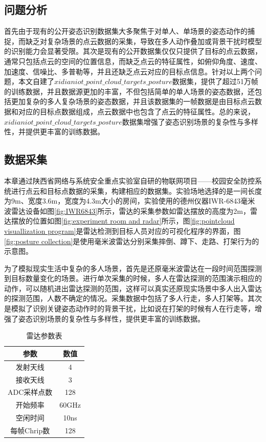 \subsection{问题分析}
首先由于现有的公开姿态识别数据集大多聚焦于对单人、单场景的姿态动作的捕捉，而缺乏对复杂场景的点云数据的采集，导致在多人动作叠加或背景干扰时模型的识别能力会显著受限。其次是现有的公开数据集仅仅只提供了目标的点云数据，通常只包括点云的空间的位置信息，而缺乏点云的特征属性，如俯仰角度、速度、加速度、信噪比、多普勒等，并且还缺乏点云对应的目标点信息。针对以上两个问题，本文自建了$xidianiot\_point\_cloud\_targets\_posture$数据集，提供了超过51万帧的训练数据，并且数据源更加的丰富，不但包括简单的单人场景的姿态数据，还包括更加复杂的多人复杂场景的姿态数据，并且该数据集的一帧数据是由目标点云数据和对应的目标点数据组成，点云数据中也包含了点云的特征属性。总的来说，$xidianiot\_point\_cloud\_targets\_posture$数据集增强了姿态识别场景的复杂性与多样性，并提供更丰富的训练数据。

\subsection{数据采集}
\label{sec:data-collection}
本章通过陕西省网络与系统安全重点实验室自研的物联网项目——校园安全防控系统进行点云和目标点数据的采集，构建相应的数据集。实验场地选择的是一间长度为9m、宽度3.6m，宽度为4.3m大小的房间，实验使用的德州仪器IWR-6843毫米波雷达设备如图\eqref{fig:IWR6843}所示，雷达的采集参数如雷达摆放的高度为2m，雷达摆放的位置如图\eqref{fig:experiment room and radar}所示，图\eqref{fig:pointcloud visuallization program}是雷达检测到目标人员对应的可视化程序的界面，图\eqref{fig:posture collection}是使用毫米波雷达分别采集摔倒、蹲下、走路、打架行为的示意图。

为了模拟现实生活中复杂的多人场景，首先是还原毫米波雷达在一段时间范围探测到目标数量变化的场景。进行单次采集的时候，多人在雷达探测的范围演示相应的动作，可以随机进出雷达探测的范围，这样可以真实还原现实场景中多人出入雷达的探测范围，人数不确定的情况。采集数据中包括了多人行走，多人打架等。其次是模拟了识别关键姿态动作时的背景干扰，比如说在打架的时候有人在行走等，增强了姿态识别场景的复杂性与多样性，提供更丰富的训练数据。
   
\begin{table}[htbp]
	\centering
	\tabcolsep=1cm
	\caption{雷达参数表}
	\begin{tabular}{cc}
			\toprule
			参数 & 数值 \\
			\midrule
			发射天线 & 4  \\
			接收天线 &3   \\
			ADC采样点数 & 128  \\ 
			开始频率 & 60GHz   \\
			空闲时间 & 10ns  \\
			每帧Chrip数 & 128 \\
			\bottomrule
	\end{tabular}
	\label{tab:radar params}
\end{table}

